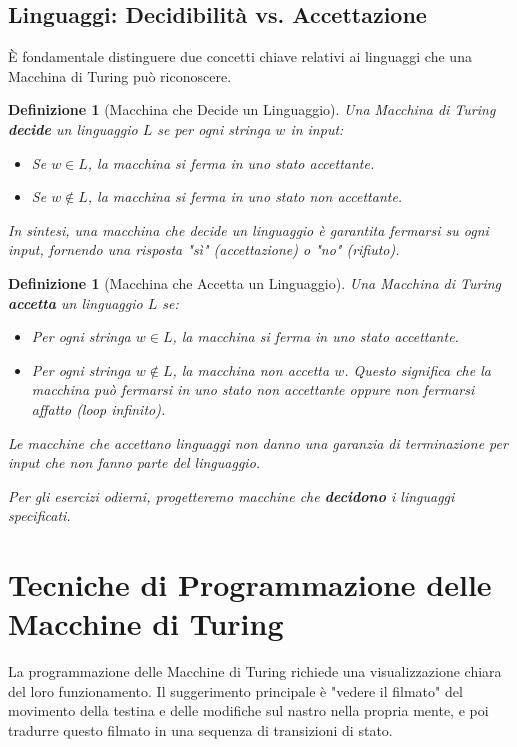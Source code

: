 \documentclass[a4paper, 11pt]{book} %
\newtheorem{definition}[theorem]{Definizione}
\theoremstyle{definition}
\begin{document}
\subsection{Linguaggi: Decidibilità vs. Accettazione}

È fondamentale distinguere due concetti chiave relativi ai linguaggi che una Macchina di Turing può riconoscere.

\begin{definition}[Macchina che Decide un Linguaggio]
Una Macchina di Turing \textbf{decide} un linguaggio $L$ se per ogni stringa $w$ in input:
\begin{itemize}
    \item Se $w \in L$, la macchina si ferma in uno stato accettante.
    \item Se $w \notin L$, la macchina si ferma in uno stato non accettante.
\end{itemize}
In sintesi, una macchina che decide un linguaggio è garantita fermarsi su ogni input, fornendo una risposta "sì" (accettazione) o "no" (rifiuto).
\end{definition}

\begin{definition}[Macchina che Accetta un Linguaggio]
Una Macchina di Turing \textbf{accetta} un linguaggio $L$ se:
\begin{itemize}
    \item Per ogni stringa $w \in L$, la macchina si ferma in uno stato accettante.
    \item Per ogni stringa $w \notin L$, la macchina non accetta $w$. Questo significa che la macchina può fermarsi in uno stato non accettante oppure non fermarsi affatto (loop infinito).
\end{itemize}
Le macchine che accettano linguaggi non danno una garanzia di terminazione per input che non fanno parte del linguaggio.

Per gli esercizi odierni, progetteremo macchine che \textbf{decidono} i linguaggi specificati.
\end{definition}

\section{Tecniche di Programmazione delle Macchine di Turing}

La programmazione delle Macchine di Turing richiede una visualizzazione chiara del loro funzionamento. Il suggerimento principale è "vedere il filmato" del movimento della testina e delle modifiche sul nastro nella propria mente, e poi tradurre questo filmato in una sequenza di transizioni di stato.
\end{document}
